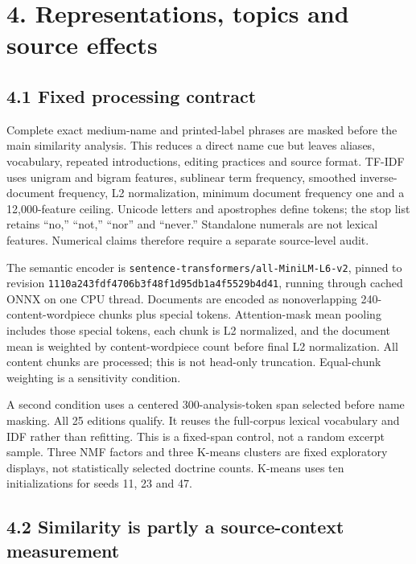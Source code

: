 \documentclass[
  10pt,
]{article}
\begin{document}
\section{4. Representations, topics and source
effects}\label{representations-topics-and-source-effects}

\subsection{4.1 Fixed processing
contract}\label{fixed-processing-contract}

Complete exact medium-name and printed-label phrases are masked before
the main similarity analysis. This reduces a direct name cue but leaves
aliases, vocabulary, repeated introductions, editing practices and
source format. TF-IDF uses unigram and bigram features, sublinear term
frequency, smoothed inverse-document frequency, L2 normalization,
minimum document frequency one and a 12,000-feature ceiling. Unicode
letters and apostrophes define tokens; the stop list retains ``no,''
``not,'' ``nor'' and ``never.'' Standalone numerals are not lexical
features. Numerical claims therefore require a separate source-level
audit.

The semantic encoder is \nolinkurl{sentence-transformers/all-MiniLM-L6-v2},
pinned to revision \nolinkurl{1110a243fdf4706b3f48f1d95db1a4f5529b4d41},
running through cached ONNX on one CPU thread. Documents are encoded as
nonoverlapping 240-content-wordpiece chunks plus special tokens.
Attention-mask mean pooling includes those special tokens, each chunk is
L2 normalized, and the document mean is weighted by content-wordpiece
count before final L2 normalization. All content chunks are processed;
this is not head-only truncation. Equal-chunk weighting is a sensitivity
condition.

A second condition uses a centered 300-analysis-token span selected
before name masking. All 25 editions qualify. It reuses the full-corpus
lexical vocabulary and IDF rather than refitting. This is a fixed-span
control, not a random excerpt sample. Three NMF factors and three
K-means clusters are fixed exploratory displays, not statistically
selected doctrine counts. K-means uses ten initializations for seeds 11,
23 and 47.

\subsection{4.2 Similarity is partly a source-context
measurement}\label{similarity-is-partly-a-source-context-measurement}
\end{document}
